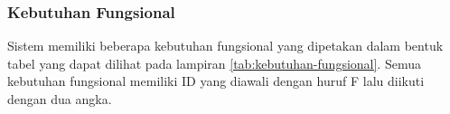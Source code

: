 \subsubsection{Kebutuhan Fungsional}
Sistem memiliki beberapa kebutuhan fungsional yang dipetakan dalam bentuk tabel yang dapat dilihat pada lampiran \ref{tab:kebutuhan-fungsional}. Semua kebutuhan fungsional memiliki ID yang diawali dengan huruf F lalu diikuti dengan dua angka.

